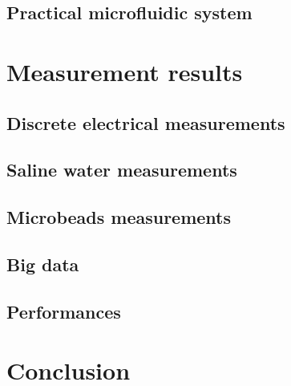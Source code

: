 \documentclass{ucetd}
\begin{document}
\section{Practical microfluidic system}
\label{sec:PracticalMicrofluidic}


\chapter{Measurement results}

\section{Discrete electrical measurements}
\label{sec:DiscreteResults}

\section{Saline water measurements}

\section{Microbeads measurements}
\label{sec:BeadsResults}

%
\section{Big data}
\label{sec:BigData}

\section{Performances}


\chapter{Conclusion}



\makebibliography

\appendix
\end{document}
